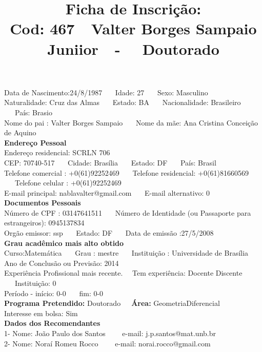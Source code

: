 \documentclass[11pt]{article}
\title{\vspace*{-4cm} Ficha de Inscrição: \\Cod: 467\ \ Valter Borges Sampaio Juniior\ \ - \ \ Doutorado 
 }
\date{}
\begin{document}
\maketitle
\vspace*{-1.5cm}
\noindent Data de Nascimento:24/8/1987
\ \ \ Idade: 27   \ \ \ Sexo: Masculino
\\
Naturalidade: Cruz das Almas  
\ \ \  Estado: BA
\ \ \  Nacionalidade: Brasileiro
\ \ \ País: Brasio
\\        
Nome do pai : Valter Borges Sampaio
\ \ \ Nome da mãe: Ana Cristina Conceição de Aquino          
\\[0.2cm]                     
\textbf{Endereço Pessoal} 
\\ 
\noindent Endereço residencial: SCRLN 706
\\
        CEP: 70740-517 
\ \ \ Cidade: Brasília 
\ \ \ Estado: DF 
\ \ \ País: Brasil
\\		
		Telefone comercial : +0(61)92252469
\ \ \ Telefone residencial: +0(61)81660569
\ \ \ Telefone celular : +0(61)92252469
\\
E-mail principal: nablavalter@gmail.com
\ \ \ E-mail alternativo: 0 
\\[0.2cm] 
\textbf{Documentos Pessoais}
\\
\noindent Número de CPF : 03147641511
\ \ \ Número de Identidade (ou Passaporte para estrangeiros): 0945137834
\\
Orgão emissor: ssp
\ \ \ Estado: DF
\ \ \ Data de emissão :27/5/2008
\\[0.3cm]
\textbf{Grau acadêmico mais alto obtido}
\\	
Curso:Matemática
\ \ \ Grau : mestre
\ \ \ Instituição : Universidade de Brasília
\\			
Ano de Conclusão ou Previsão: 2014
\\ 
Experiência Profissional mais recente. \ \  
Tem experiência: Docente Discente  
\ \ \ Instituição: 0
\\  
Período - início: 0-0
\ \ \ fim: 0-0
\\[0.2cm] 
\textbf{Programa Pretendido:} Doutorado\ \ \ \textbf{Área:} GeometriaDiferencial\\
Interesse em bolsa: Sim
\\[0.3cm]		
\textbf{Dados dos Recomendantes} 
\\
1- Nome: João Paulo dos Santos
\ \ \ \  e-mail: j.p.santos@mat.unb.br 
\\
2- Nome: Noraí Romeu Rocco
\ \ \ \ e-mail: norai.rocco@gmail.com
\\
\end{document}
